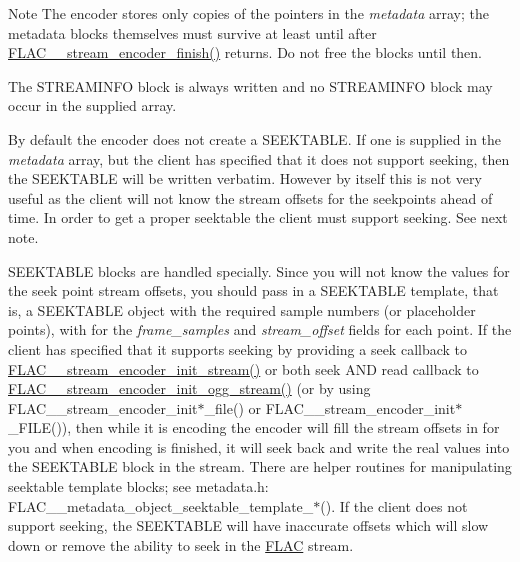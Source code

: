 \begin{DoxyNote}{Note}
The encoder stores only copies of the pointers in the {\itshape metadata} array; the metadata blocks themselves must survive at least until after \hyperlink{group__flac__stream__encoder_gab2c1e5477c1e3fe9ad0d722ff8eecda2}{F\+L\+A\+C\+\_\+\+\_\+stream\+\_\+encoder\+\_\+finish()} returns. Do not free the blocks until then.

The S\+T\+R\+E\+A\+M\+I\+N\+FO block is always written and no S\+T\+R\+E\+A\+M\+I\+N\+FO block may occur in the supplied array.

By default the encoder does not create a S\+E\+E\+K\+T\+A\+B\+LE. If one is supplied in the {\itshape metadata} array, but the client has specified that it does not support seeking, then the S\+E\+E\+K\+T\+A\+B\+LE will be written verbatim. However by itself this is not very useful as the client will not know the stream offsets for the seekpoints ahead of time. In order to get a proper seektable the client must support seeking. See next note.

S\+E\+E\+K\+T\+A\+B\+LE blocks are handled specially. Since you will not know the values for the seek point stream offsets, you should pass in a S\+E\+E\+K\+T\+A\+B\+LE \textquotesingle{}template\textquotesingle{}, that is, a S\+E\+E\+K\+T\+A\+B\+LE object with the required sample numbers (or placeholder points), with {} for the {\itshape frame\+\_\+samples} and {\itshape stream\+\_\+offset} fields for each point. If the client has specified that it supports seeking by providing a seek callback to \hyperlink{group__flac__stream__encoder_ga85221c4ceb9f22dfd4983d8f07a9a35b}{F\+L\+A\+C\+\_\+\+\_\+stream\+\_\+encoder\+\_\+init\+\_\+stream()} or both seek A\+ND read callback to \hyperlink{group__flac__stream__encoder_ga87af71d74c09f7d482f9f420ef9bf826}{F\+L\+A\+C\+\_\+\+\_\+stream\+\_\+encoder\+\_\+init\+\_\+ogg\+\_\+stream()} (or by using F\+L\+A\+C\+\_\+\+\_\+stream\+\_\+encoder\+\_\+init$\ast$\+\_\+file() or F\+L\+A\+C\+\_\+\+\_\+stream\+\_\+encoder\+\_\+init$\ast$\+\_\+\+F\+I\+LE()), then while it is encoding the encoder will fill the stream offsets in for you and when encoding is finished, it will seek back and write the real values into the S\+E\+E\+K\+T\+A\+B\+LE block in the stream. There are helper routines for manipulating seektable template blocks; see metadata.\+h\+: F\+L\+A\+C\+\_\+\+\_\+metadata\+\_\+object\+\_\+seektable\+\_\+template\+\_\+$\ast$(). If the client does not support seeking, the S\+E\+E\+K\+T\+A\+B\+LE will have inaccurate offsets which will slow down or remove the ability to seek in the \hyperlink{namespace_f_l_a_c}{F\+L\+AC} stream.


\end{DoxyNote}
